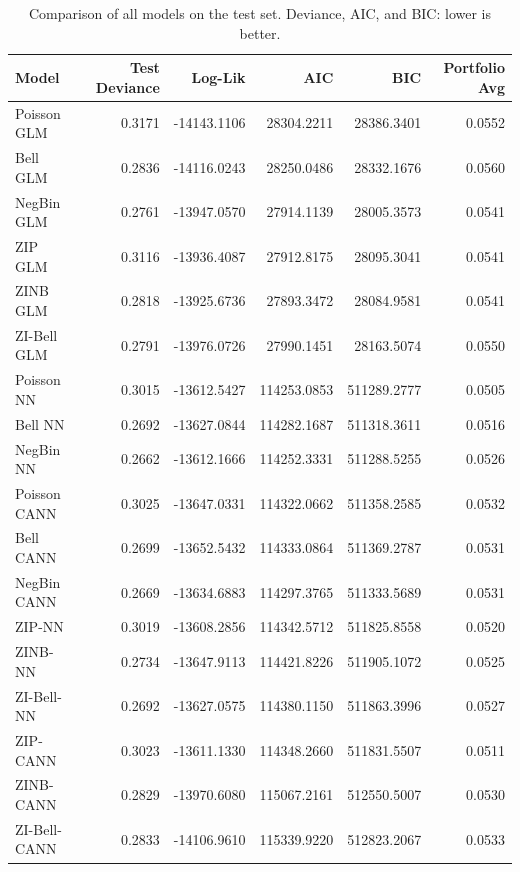 \begin{table}
\caption{Comparison of all models on the test set. Deviance, AIC, and BIC: lower is better.}
\label{tab:comparison}
\begin{tabular}{lrrrrr}
\toprule
Model & Test Deviance & Log-Lik & AIC & BIC & Portfolio Avg \\
\midrule
Poisson GLM & 0.3171 & -14143.1106 & 28304.2211 & 28386.3401 & 0.0552 \\
Bell GLM & 0.2836 & -14116.0243 & 28250.0486 & 28332.1676 & 0.0560 \\
NegBin GLM & 0.2761 & -13947.0570 & 27914.1139 & 28005.3573 & 0.0541 \\
ZIP GLM & 0.3116 & -13936.4087 & 27912.8175 & 28095.3041 & 0.0541 \\
ZINB GLM & 0.2818 & -13925.6736 & 27893.3472 & 28084.9581 & 0.0541 \\
ZI-Bell GLM & 0.2791 & -13976.0726 & 27990.1451 & 28163.5074 & 0.0550 \\
Poisson NN & 0.3015 & -13612.5427 & 114253.0853 & 511289.2777 & 0.0505 \\
Bell NN & 0.2692 & -13627.0844 & 114282.1687 & 511318.3611 & 0.0516 \\
NegBin NN & 0.2662 & -13612.1666 & 114252.3331 & 511288.5255 & 0.0526 \\
Poisson CANN & 0.3025 & -13647.0331 & 114322.0662 & 511358.2585 & 0.0532 \\
Bell CANN & 0.2699 & -13652.5432 & 114333.0864 & 511369.2787 & 0.0531 \\
NegBin CANN & 0.2669 & -13634.6883 & 114297.3765 & 511333.5689 & 0.0531 \\
ZIP-NN & 0.3019 & -13608.2856 & 114342.5712 & 511825.8558 & 0.0520 \\
ZINB-NN & 0.2734 & -13647.9113 & 114421.8226 & 511905.1072 & 0.0525 \\
ZI-Bell-NN & 0.2692 & -13627.0575 & 114380.1150 & 511863.3996 & 0.0527 \\
ZIP-CANN & 0.3023 & -13611.1330 & 114348.2660 & 511831.5507 & 0.0511 \\
ZINB-CANN & 0.2829 & -13970.6080 & 115067.2161 & 512550.5007 & 0.0530 \\
ZI-Bell-CANN & 0.2833 & -14106.9610 & 115339.9220 & 512823.2067 & 0.0533 \\
\bottomrule
\end{tabular}
\end{table}
